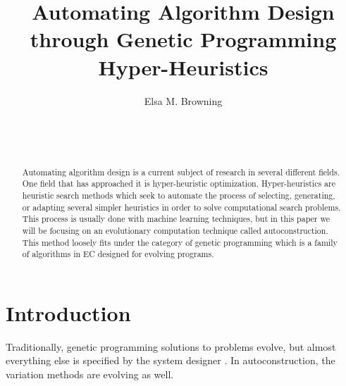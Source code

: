 \documentclass{sig-alternate}
\begin{document}

\title{Automating Algorithm Design through Genetic Programming Hyper-Heuristics}


\author{
\alignauthor
Elsa M. Browning\\
	\\
	\\
	\\
}

\maketitle
\begin{abstract}
	Automating algorithm design is a current subject of research in several different fields. One field that has approached it is hyper-heuristic optimization. Hyper-heuristics are heuristic search methods which seek to automate the process of selecting, generating, or adapting several simpler heuristics in order to solve computational search problems. This process is usually done with machine learning techniques, but in this paper we will be focusing on an evolutionary computation technique called autoconstruction. This method loosely fits under the category of genetic programming which is a family of algorithms in EC designed for evolving programs.
\end{abstract}


\section{Introduction}
\label{sec:introduction}

Traditionally, genetic programming solutions to problems evolve, but almost everything else is specified by the system designer \cite{spector:2016}. In autoconstruction, the variation methods are evolving as well.
\end{document}
